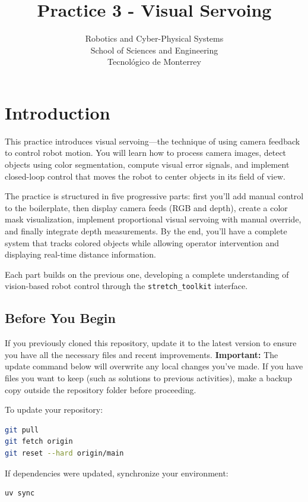 \documentclass[11pt,a4paper]{article}
\title{\textbf{Practice 3 - Visual Servoing}}
\author{
    Robotics and Cyber-Physical Systems \\
    School of Sciences and Engineering \\
    Tecnol\'ogico de Monterrey
}
\date{}
\begin{document}
\maketitle

\section*{Introduction}

This practice introduces visual servoing—the technique of using camera feedback to control robot motion. You will learn how to process camera images, detect objects using color segmentation, compute visual error signals, and implement closed-loop control that moves the robot to center objects in its field of view.

The practice is structured in five progressive parts: first you'll add manual control to the boilerplate, then display camera feeds (RGB and depth), create a color mask visualization, implement proportional visual servoing with manual override, and finally integrate depth measurements. By the end, you'll have a complete system that tracks colored objects while allowing operator intervention and displaying real-time distance information.

Each part builds on the previous one, developing a complete understanding of vision-based robot control through the \texttt{stretch\_toolkit} interface.

\subsection*{Before You Begin}

If you previously cloned this repository, update it to the latest version to ensure you have all the necessary files and recent improvements. \textbf{Important:} The update command below will overwrite any local changes you've made. If you have files you want to keep (such as solutions to previous activities), make a backup copy outside the repository folder before proceeding.

To update your repository:

\begin{lstlisting}[language=bash]
git pull
git fetch origin
git reset --hard origin/main
\end{lstlisting}

If dependencies were updated, synchronize your environment:

\begin{lstlisting}[language=bash]
uv sync
\end{lstlisting}
\end{document}
